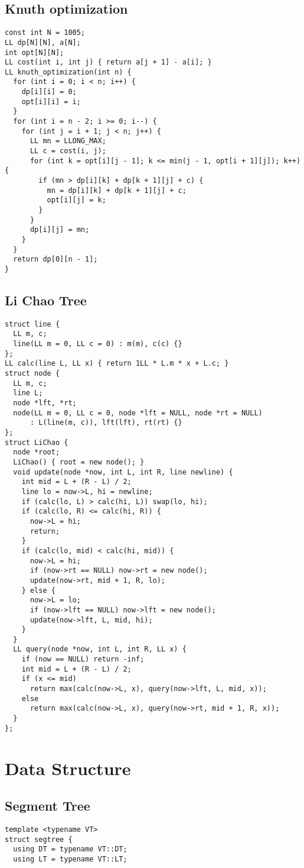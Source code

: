 \documentclass[FSZ,a4paper,onesided]{article}
\begin{document}
\begin{multicols*}{\COLS}
\subsection{Knuth optimization}
\begin{lstlisting}
const int N = 1005;
LL dp[N][N], a[N];
int opt[N][N];
LL cost(int i, int j) { return a[j + 1] - a[i]; }
LL knuth_optimization(int n) {
  for (int i = 0; i < n; i++) {
    dp[i][i] = 0;
    opt[i][i] = i;
  }
  for (int i = n - 2; i >= 0; i--) {
    for (int j = i + 1; j < n; j++) {
      LL mn = LLONG_MAX;
      LL c = cost(i, j);
      for (int k = opt[i][j - 1]; k <= min(j - 1, opt[i + 1][j]); k++) {
        if (mn > dp[i][k] + dp[k + 1][j] + c) {
          mn = dp[i][k] + dp[k + 1][j] + c;
          opt[i][j] = k;
        }
      }
      dp[i][j] = mn;
    }
  }
  return dp[0][n - 1];
}
\end{lstlisting}
\subsection{Li Chao Tree}
\begin{lstlisting}
struct line {
  LL m, c;
  line(LL m = 0, LL c = 0) : m(m), c(c) {}
};
LL calc(line L, LL x) { return 1LL * L.m * x + L.c; }
struct node {
  LL m, c;
  line L;
  node *lft, *rt;
  node(LL m = 0, LL c = 0, node *lft = NULL, node *rt = NULL)
      : L(line(m, c)), lft(lft), rt(rt) {}
};
struct LiChao {
  node *root;
  LiChao() { root = new node(); }
  void update(node *now, int L, int R, line newline) {
    int mid = L + (R - L) / 2;
    line lo = now->L, hi = newline;
    if (calc(lo, L) > calc(hi, L)) swap(lo, hi);
    if (calc(lo, R) <= calc(hi, R)) {
      now->L = hi;
      return;
    }
    if (calc(lo, mid) < calc(hi, mid)) {
      now->L = hi;
      if (now->rt == NULL) now->rt = new node();
      update(now->rt, mid + 1, R, lo);
    } else {
      now->L = lo;
      if (now->lft == NULL) now->lft = new node();
      update(now->lft, L, mid, hi);
    }
  }
  LL query(node *now, int L, int R, LL x) {
    if (now == NULL) return -inf;
    int mid = L + (R - L) / 2;
    if (x <= mid)
      return max(calc(now->L, x), query(now->lft, L, mid, x));
    else
      return max(calc(now->L, x), query(now->rt, mid + 1, R, x));
  }
};
\end{lstlisting}
\section{Data Structure}
\subsection{Segment Tree}
\begin{lstlisting}
template <typename VT>
struct segtree {
  using DT = typename VT::DT;
  using LT = typename VT::LT;


\end{lstlisting}
\end{multicols*}
\end{document}
